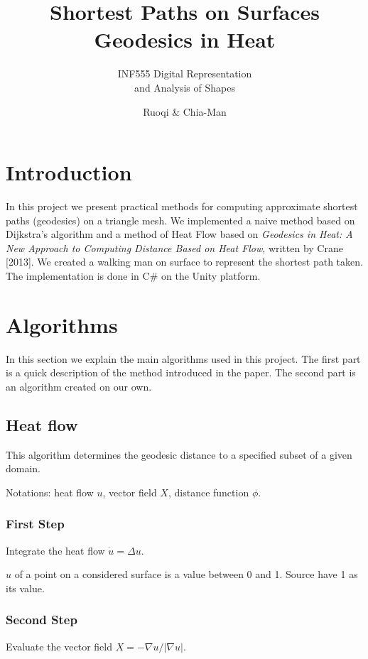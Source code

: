 \documentclass[a4paper,12pt,twoside]{article}
\title{Shortest Paths on Surfaces\\ Geodesics in Heat}
\subtitle{INF555 Digital Representation\\ and Analysis of Shapes }
\author{Ruoqi \bsc{He} \& Chia-Man \bsc{Hung}}
\begin{document}
\maketitle

\section{Introduction}

In this project we present practical methods for computing approximate shortest paths (geodesics) on a triangle mesh. We implemented a naive method based on Dijkstra's algorithm and a method of Heat Flow based on \textit{Geodesics in Heat: A New Approach to Computing Distance Based on Heat Flow}, written by Crane [2013]. We created a walking man on surface to represent the shortest path taken. The implementation is done in C\# on the Unity platform.

\section{Algorithms}

In this section we explain the main algorithms used in this project. The first part is a quick description of the method introduced in the paper. The second part is an algorithm created on our own.

\subsection{Heat flow}
This algorithm determines the geodesic distance to a specified subset of a given domain. 

Notations: heat flow $u$, vector field $X$, distance function $\phi$.

\subsubsection{First Step}
Integrate the heat flow $\dot{u} = \Delta u$.

$u$ of a point on a considered surface is a value between 0 and 1. Source have 1 as its value.

\subsubsection{Second Step}
Evaluate the vector field $X = -\nabla u / \left | \nabla u \right |$.
\end{document}
